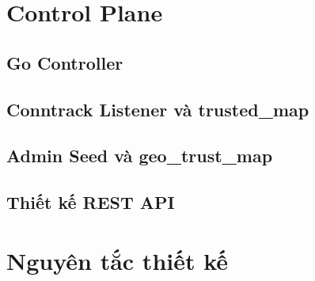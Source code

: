 \documentclass[../DoAn.tex]{subfiles}
\begin{document}
\section{Control Plane}

\subsection{Go Controller}

\subsection{Conntrack Listener và trusted\_map}

\subsection{Admin Seed và geo\_trust\_map}

\subsection{Thiết kế REST API}

\section{Nguyên tắc thiết kế}
\end{document}
